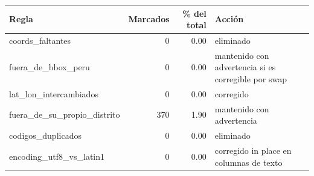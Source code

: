 \begin{tabular}{lrrp{5.4cm}}
\toprule
Regla & Marcados & \% del total & Acción \\
\midrule
coords\_faltantes & 0 & 0.00 & eliminado \\
fuera\_de\_bbox\_peru & 0 & 0.00 & mantenido con advertencia si es corregible por swap \\
lat\_lon\_intercambiados & 0 & 0.00 & corregido \\
fuera\_de\_su\_propio\_distrito & 370 & 1.90 & mantenido con advertencia \\
codigos\_duplicados & 0 & 0.00 & eliminado \\
encoding\_utf8\_vs\_latin1 & 0 & 0.00 & corregido in place en columnas de texto \\
\bottomrule
\end{tabular}
